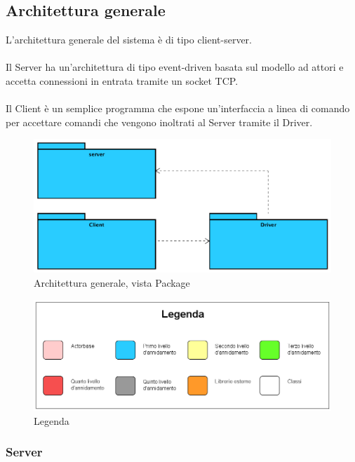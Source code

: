 \documentclass[a4paper]{article}
\begin{document}
		\subsection{Architettura generale}
        	L'architettura generale del sistema è di tipo client-server. \\ \\
            Il Server ha un'architettura di tipo event-driven basata sul modello ad attori e accetta connessioni in entrata tramite un socket TCP. \\ \\
			Il Client è un semplice programma che espone un'interfaccia a linea di comando per accettare comandi che vengono inoltrati al Server tramite 
			il Driver.
            
        \begin{figure} [H]
			\centering
			\includegraphics[scale=0.25]{ST/generalLevel}
			\caption{Architettura generale, vista Package}
		\end{figure}
		
		\begin{figure} [H]
			\centering
			\includegraphics[scale=0.3]{ST/Legenda}
			\caption{Legenda}
		\end{figure}
		
        \subsubsection{Server}
		
\end{document}
